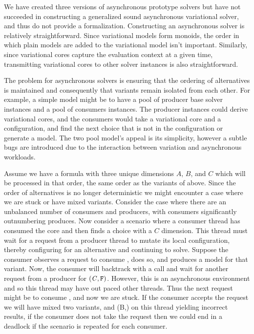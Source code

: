 We have created three versions of asynchronous prototype solvers but have not
succeeded in constructing a generalized sound asynchronous variational solver,
and thus do not provide a formalization. Constructing an asynchronous solver is
relatively straightforward. Since variational models form monoids, the order in
which plain models are added to the variational model isn't important.
Similarly, since variational cores capture the evaluation context at a given
time, transmitting variational cores to other solver instances is also
straightforward.

The problem for asynchronous solvers is ensuring that the ordering of
alternatives is maintained and consequently that variants remain isolated from
each other. For example, a simple model might be to have a pool of producer base
solver instances and a pool of consumers instances. The producer instances could
derive variational cores, and the consumers would take a variational core and a
configuration, and find the next choice that is not in the configuration or
generate a model. The two pool model's appeal is its simplicity, however a
subtle bugs are introduced due to the interaction between variation and
asynchronous workloads.

Assume we have a formula with three unique dimensions $A$, $B$, and $C$ which
will be processed in that order, \ie{} the same order as the variants of \fV{}
above. Since the order of alternatives is no longer deterministic we might
encounter a case where we are stuck or have mixed variants. Consider the case
where there are an unbalanced number of consumers and producers, with consumers
significantly outnumbering produces. Now consider a scenario where a consumer
thread has consumed the  core and then finds a
choice with a $C$ dimension. This thread must wait for a request from a producer
thread to mutate its local configuration, thereby configuring for an alternative
and continuing to solve. Suppose the consumer observes a request to consume
, does so, and produces a model for that variant. Now, the
consumer will backtrack with a  call and wait for another request from a
producer for $\mathit{(C, \texttt{F}{})}$. However, this is an asynchronous environment
and so this thread may have out paced other threads. Thus the next request might
be to consume , and now we are stuck. If the consumer accepts
the request we will have mixed two variants,  and \set(B,\tru{})
on this thread yielding incorrect results, if the consumer does not take the
request then we could end in a deadlock if the scenario is repeated for each
consumer.

